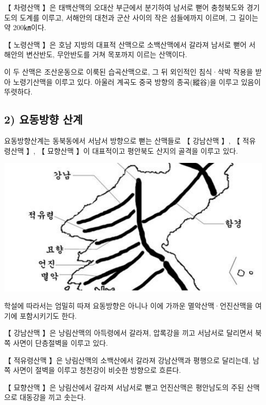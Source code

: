 \documentclass[12pt,a4paper]{book}
\begin{document}
【 차령산맥 】은 태백산맥의 오대산 부근에서 분기하여 남서로 뻗어 충청북도와 경기도의 도계를 이루고, 서해안의 대천과 군산 사이의 작은 섬들에까지 이르며, 그 길이는 약 200㎞이다.

【 노령산맥 】은 호남 지방의 대표적 산맥으로 소백산맥에서 갈라져 남서로 뻗어 서해안의 변산반도, 무안반도를 거쳐 목포까지 이르는 산맥이다.





이 두 산맥은 조산운동으로 이룩된 습곡산맥으로, 그 뒤 외인적인 침식·삭박 작용을 받아 노령기산맥을 이루고 있다. 아울러 계곡도 중국 방향의 종곡(縱谷)을 이루고 있음이 뚜렷하다. 



		\newpage  \null
		\subsection{2) 요동방향 산계}
		\null




요동방향산계는 동북동에서 서남서 방향으로 뻗는 산맥들로 【 강남산맥 】, 【 적유령산맥 】, 【 묘향산맥 】이 대표적이고 평안북도 산지의 골격을 이루고 있다.

				\includegraphics[width=1.0\textwidth]{./fig/fig__112.pdf}


학설에 따라서는 엄밀히 따져 요동방향은 아니나 이에 가까운 멸악산맥·언진산맥을 여기에 포함시키기도 한다. 

【 강남산맥 】은 낭림산맥의 아득령에서 갈라져, 압록강을 끼고 서남서로 달리면서 북쪽 사면이 단층절벽을 이루고 있다.

【 적유령산맥 】은 낭림산맥의 소백산에서 갈라져 강남산맥과 평행으로 달리는데, 남쪽 사면이 절벽을 이루고 청천강이 비슷한 방향으로 흐른다.

【 묘향산맥 】은 낭림산에서 갈라져 서남서로 뻗고 언진산맥은 평안남도의 주된 산맥으로 대동강을 끼고 솟는다. 
\end{document}
